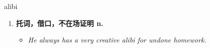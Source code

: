 
\begin{frame}
{\huge alibi}
\begin{center}
\begin{enumerate}\Large
  \item \textbf{托词，借口，不在场证明 n.}
  \begin{itemize}
    \item \em{\Large{He always has a very creative alibi for undone homework.}}
  \end{itemize}
\end{enumerate}
\end{center}
\end{frame}
